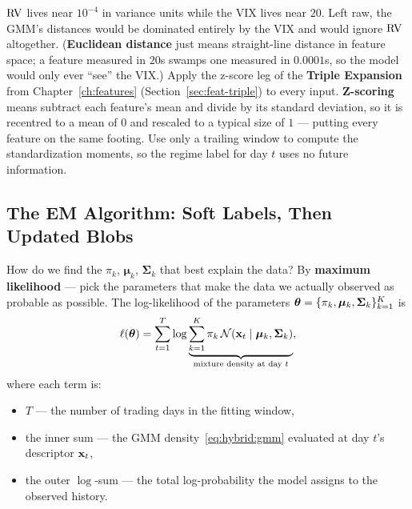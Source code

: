 \begin{warning}
$\operatorname{RV}$ lives near $10^{-4}$ in variance units while the VIX lives near
$20$.  Left raw, the GMM's distances would be dominated entirely by the
VIX and would ignore $\operatorname{RV}$ altogether.  (\textbf{Euclidean distance} just
means straight-line distance in feature space; a feature measured in
$20$s swamps one measured in $0.0001$s, so the model would only ever
``see'' the VIX.)  Apply the z-score leg of the \textbf{Triple Expansion}
from Chapter~\ref{ch:features} (Section~\ref{sec:feat-triple}) to every
input.  \textbf{Z-scoring} means subtract each feature's mean and divide
by its standard deviation, so it is recentred to a mean of $0$ and
rescaled to a typical size of $1$ --- putting every feature on the same
footing.  Use only a trailing window to compute the standardization
moments, so the regime label for day $t$ uses no future information.
\end{warning}

\subsection{The EM Algorithm: Soft Labels, Then Updated Blobs}
\label{sec:hybrid:em}

How do we find the $\pi_k$, $\bm{\mu}_k$, $\bm{\Sigma}_k$ that best explain
the data?  By \textbf{maximum likelihood} --- pick the parameters that make
the data we actually observed as probable as possible.  The log-likelihood
of the parameters
$\bm{\theta} = \{\pi_k, \bm{\mu}_k, \bm{\Sigma}_k\}_{k=1}^K$ is
\begin{equation}\label{eq:hybrid:gmm-loglik}
  \ell(\bm{\theta}) = \sum_{t=1}^{T} \log
    \underbrace{\sum_{k=1}^{K} \pi_k\,\mathcal{N}(\mathbf{x}_t \mid \bm{\mu}_k, \bm{\Sigma}_k)}_{\text{mixture density at day } t},
\end{equation}
where each term is:
\begin{itemize}
  \item $T$ --- the number of trading days in the fitting window,
  \item the inner sum --- the GMM density~\eqref{eq:hybrid:gmm}
        evaluated at day $t$'s descriptor $\mathbf{x}_t$,
  \item the outer $\log$-sum --- the total log-probability the model
        assigns to the observed history.
\end{itemize}

